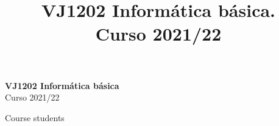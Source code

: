 \documentclass[11pt,fleqn]{book}                                                          %
\begin{document}
\title{VJ1202 Informática básica. \\ Curso 2021/22}

\begingroup
\thispagestyle{empty}
\centering
\vspace*{5cm}
\par\normalfont\fontsize{35}{35}\sffamily\selectfont
\textbf{VJ1202 Informática básica}\\
{\LARGE Curso 2021/22}\par %
\vspace*{1cm}
{\Huge Course students}\par %
\endgroup




\pagestyle{empty}        %
\tableofcontents         %
\cleardoublepage         %
\pagestyle{fancy}        %
\end{document}
